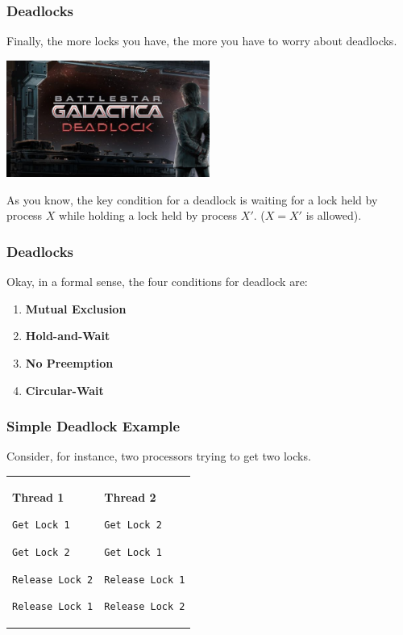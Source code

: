 \begin{frame}
\frametitle{Deadlocks}

Finally, the more locks you have, the more you have to worry about deadlocks.

\begin{center}
	\includegraphics[width=0.5\textwidth]{images/deadlock.jpg}
\end{center}

As you know, the key condition for a deadlock is waiting for a lock held by process $X$ while holding a lock held by process $X'$. ($X = X'$ is allowed).

\end{frame}


\begin{frame}
\frametitle{Deadlocks}



Okay, in a formal sense, the four conditions for deadlock are:

\begin{enumerate}
	\item \textbf{Mutual Exclusion}
	\item \textbf{Hold-and-Wait}
	\item \textbf{No Preemption}
	\item \textbf{Circular-Wait}
\end{enumerate}

\end{frame}


\begin{frame}[fragile]
\frametitle{Simple Deadlock Example}

Consider, for instance, two processors trying to get two locks.

\begin{center}
  \begin{tabular}{ll}
\begin{minipage}{.4\textwidth}
      {\bf Thread 1}

      \verb+Get Lock 1+

      \verb+Get Lock 2+

      \verb+Release Lock 2+

      \verb+Release Lock 1+
\end{minipage} & 
\begin{minipage}{.4\textwidth}
      {\bf Thread 2}

      \verb+Get Lock 2+

      \verb+Get Lock 1+

      \verb+Release Lock 1+

      \verb+Release Lock 2+
\end{minipage}
\end{tabular}
\end{center}


\end{frame}

